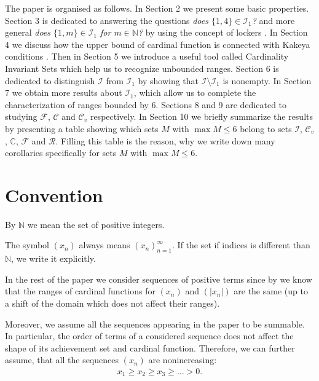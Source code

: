 \documentclass{amsart}
\theoremstyle{definition}
\newcommand{\C}{\mathbb C}
\newcommand{\Cv}{\mathcal{C}_{v}}
\begin{document}
The paper is organised as follows. In Section 2 we present some basic properties. Section 3 is dedicated to answering the questions \emph{does $\{1,4\}\in \mathcal{I}_1$?} and more general \emph{does $\{1,m\}\in \mathcal{I}_1$ for $m\in\mathbb{N}$?} by using the concept of lockers \cite{DJK}. In Section 4 we discuss how the upper bound of cardinal function is connected with Kakeya conditions \cite{MarMis}. Then in Section 5 we introduce a useful tool called Cardinality Invariant Sets which help us to recognize unbounded ranges. Section 6 is dedicated to distinguish $\mathcal{I}$ from $\mathcal{I}_1$ by showing that $\mathcal{I}\setminus \mathcal{I}_1$ is nonempty. In Section 7 we obtain more results about $\mathcal{I}_1$, which allow us to complete the characterization of ranges bounded by $6$. Sections 8 and 9 are dedicated to studying  $\mathcal{F}$, $\mathcal{C}$ and  $\Cv$ respectively. In Section 10 we briefly summarize the results by presenting a table showing which sets $M$ with $\max M\leq 6$ belong to sets $\mathcal{I}$, $\Cv$, $\mathcal{\C}$, $\mathcal{F}$ and $\mathcal{R}$. Filling this table is the reason, why we write down many corollaries specifically for sets $M$ with $\max M\leq 6$.



\section*{Convention}

By $\mathbb{N}$ we mean the set of positive integers.

The symbol $(x_{n})$ always means $(x_{n})_{n=1}^{\infty}$. If the set if indices is different than $\mathbb{N}$, we write it explicitly.

In the rest of the paper we consider sequences of positive terms since by \cite[Section 2]{cardfun} we know that the ranges of cardinal functions for $(x_n)$ and $(\vert x_n\vert)$ are the same (up to a shift of the domain which does not affect their ranges).

Moreover, we assume all the sequences appearing in the paper to be summable. In particular, the order of terms of a considered sequence does not affect the shape of its achievement set and cardinal function. Therefore, we can further assume, that all the sequences $(x_{n})$ are nonincreasing:
\begin{align}\label{IneqAssumption}
x_{1}\geq x_{2} \geq x_{3} \geq \ldots > 0.
\end{align}
\end{document}
